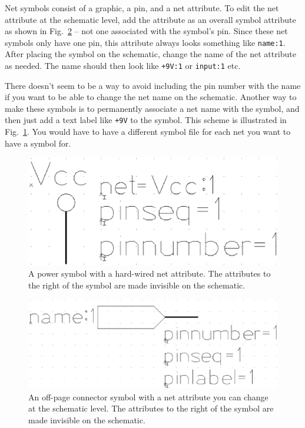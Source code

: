Net symbols consist of a graphic, a pin, and a net attribute.  To edit the net attribute at the schematic level,  add the attribute as an overall symbol attribute as shown in Fig.\ \ref{symbol_net} -- not one associated with the symbol's pin.   Since these net symbols only have one pin, this attribute always looks something like \texttt{name:1}.  After placing the symbol on the schematic, change the name of the net attribute as needed.  The name should then look like \texttt{+9V:1} or \texttt{input:1} etc.  

There doesn't seem to be a way to avoid including the pin number with the name if you want to be able to change the net name on the schematic.  Another way to make these symbols is to permanently associate a net name with the symbol, and then just add a text label like \texttt{+9V} to the symbol.  This scheme is illustrated in Fig.\ \ref{symbol_nonet}.  You would have to have a different symbol file for each net you want to have a symbol for.
\begin{figure}[ht]
	\begin{center}
		\includegraphics[clip,scale=0.2]{generic_vcc.eps}
		\caption{A power symbol with a hard-wired net attribute.  The attributes to the right of the symbol are made invisible on the schematic.\label{symbol_nonet}}
	\end{center} 
\end{figure}

\begin{figure}[ht]
	\begin{center}
		\includegraphics[clip,scale=0.2]{input_netname.eps}
		\caption{An off-page connector symbol with a net attribute you can change at the schematic level.  The attributes to the right of the symbol are made invisible on the schematic.\label{symbol_net}}
	\end{center} 
\end{figure}
